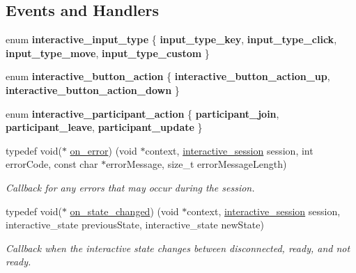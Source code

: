 \subsection*{Events and Handlers}
\begin{DoxyCompactItemize}
\item 
\mbox{\label{group___interactivity_gae2aaf8bdc60b4b126b354f9bf2c5f16a}} 
enum {\bfseries interactive\+\_\+input\+\_\+type} \{ {\bfseries input\+\_\+type\+\_\+key}, 
{\bfseries input\+\_\+type\+\_\+click}, 
{\bfseries input\+\_\+type\+\_\+move}, 
{\bfseries input\+\_\+type\+\_\+custom}
 \}
\item 
\mbox{\label{group___interactivity_ga1df1e232acffb35957e77dfa4008a8a8}} 
enum {\bfseries interactive\+\_\+button\+\_\+action} \{ {\bfseries interactive\+\_\+button\+\_\+action\+\_\+up}, 
{\bfseries interactive\+\_\+button\+\_\+action\+\_\+down}
 \}
\item 
\mbox{\label{group___interactivity_ga0de01cad238e1b3870f52a70a4ef0a94}} 
enum {\bfseries interactive\+\_\+participant\+\_\+action} \{ {\bfseries participant\+\_\+join}, 
{\bfseries participant\+\_\+leave}, 
{\bfseries participant\+\_\+update}
 \}
\item 
typedef void($\ast$ \mbox{\hyperlink{group___interactivity_gabb1eefe2ce4247a4562fe1f231a35144}{on\+\_\+error}}) (void $\ast$context, \mbox{\hyperlink{group___interactivity_ga6d8819d38b8dc8994a2299cf22a65a31}{interactive\+\_\+session}} session, int error\+Code, const char $\ast$error\+Message, size\+\_\+t error\+Message\+Length)
\begin{DoxyCompactList}\small\item\em Callback for any errors that may occur during the session. \end{DoxyCompactList}\item 
typedef void($\ast$ \mbox{\hyperlink{group___interactivity_ga2decafcde365ca3bc6907760ef4fcc5f}{on\+\_\+state\+\_\+changed}}) (void $\ast$context, \mbox{\hyperlink{group___interactivity_ga6d8819d38b8dc8994a2299cf22a65a31}{interactive\+\_\+session}} session, interactive\+\_\+state previous\+State, interactive\+\_\+state new\+State)
\begin{DoxyCompactList}\small\item\em Callback when the interactive state changes between disconnected, ready, and not ready. \end{DoxyCompactList}\item 

\end{DoxyCompactItemize}
